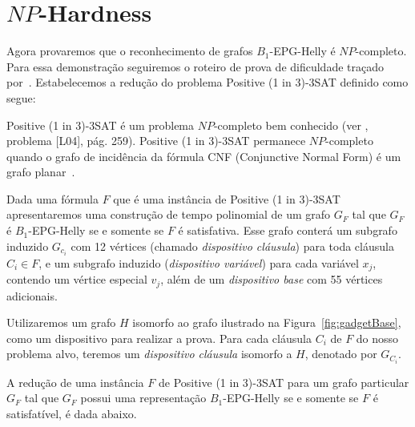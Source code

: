 \section{$NP$-Hardness}\label{sec:sectionDispositivoClausula}

Agora provaremos que o reconhecimento de grafos   $B_1$-EPG-Helly é $NP$-completo. Para essa demonstração seguiremos o roteiro de prova de dificuldade traçado por~\cite{heldt2014}.  Estabelecemos a redução do problema {\sc Positive (1 in 3)-3SAT} definido como segue:



{\sc Positive (1 in 3)-3SAT } é um problema $NP$-completo bem conhecido (ver \cite{johnson1979}, problema [L04], pág. 259). {\sc Positive (1 in 3)-3SAT} permanece $NP$-completo quando o grafo de incidência da fórmula CNF (Conjunctive Normal Form) é um grafo planar~\cite{mulzer2008minimum}.

Dada uma fórmula  $F$ que é uma instância de {\sc Positive (1 in 3)-3SAT} apresentaremos uma construção de tempo polinomial de um grafo $ G_F$ tal que  $ G_F $ é $ B_1$-EPG-Helly se e somente se $ F $ é satisfativa. Esse grafo conterá um subgrafo induzido  $ G_{c_i}$ com 12 vértices (chamado \emph {dispositivo cláusula}) para toda cláusula $C_i \in F$, e um subgrafo induzido (\emph {dispositivo variável}) para cada variável $ x_j$, contendo um vértice especial   $ v_j$, além de um  \emph{dispositivo base}  com 55 vértices adicionais.

Utilizaremos um grafo $H$ isomorfo ao grafo ilustrado na Figura~\ref{fig:gadgetBase}, como um  dispositivo para realizar a prova. Para cada cláusula  $C_i$ de $F$ do nosso problema alvo, teremos um \emph{dispositivo cláusula} isomorfo a $H$, denotado por $G_{C_i}$. %

 


A redução  de uma instância $F$ de  {\sc Positive (1 in 3)-3SAT}  para um grafo particular $G_F$ tal que $G_F$ possui uma representação $B_{1}$-EPG-Helly se e somente se $F$ é satisfatível, é dada abaixo.

